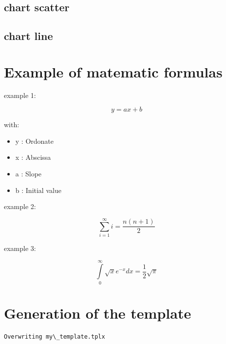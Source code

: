 \documentclass[reprint, floatfix, groupaddress, prb]{article}
\providecommand{\tightlist}{%
      \setlength{\itemsep}{0pt}\setlength{\parskip}{0pt}}
\begin{document}
    
    \hypertarget{chart-scatter}{%
\subsection{chart scatter}\label{chart-scatter}}

        
    \begin{figure}
        \begin{center}\end{center}
        \caption{}
        \label{}
    \end{figure}
    
    
    \hypertarget{chart-line}{%
\subsection{chart line}\label{chart-line}}

        
    \begin{figure}
        \begin{center}\end{center}
        \caption{}
        \label{}
    \end{figure}
    
    
    \hypertarget{example-of-matematic-formulas}{%
\section{Example of matematic
formulas}\label{example-of-matematic-formulas}}

    example 1:

\[ y = a x + b \]

with:

\begin{itemize}
\tightlist
\item
  y : Ordonate
\item
  x : Abscissa
\item
  a : Slope
\item
  b : Initial value
\end{itemize}

    example 2:

\[\sum_{i=1}^{\infty} i = \frac{n(n+1)}{2}\]

    example 3:

\[ \int\limits_0^\infty {\sqrt{x} e^{ - x} dx} = \frac{1}{2}\sqrt{\pi}\]

    \hypertarget{generation-of-the-template}{%
\section{Generation of the template}\label{generation-of-the-template}}

    \begin{Verbatim}[commandchars=\\\{\}]
Overwriting my\_template.tplx
    \end{Verbatim}


    
    
    
\end{document}
